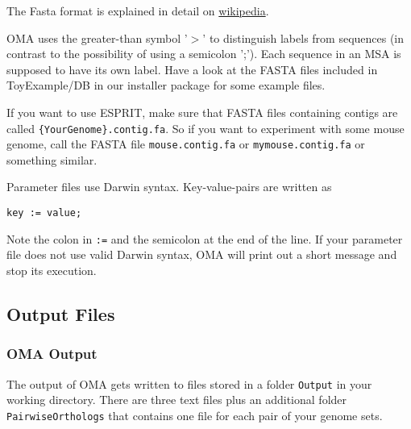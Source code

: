 \documentclass{scrartcl}
\begin{document}
\noindent The Fasta format is explained in detail on \href{http://en.wikipedia.org/wiki/FASTA\_format}{wikipedia}.

\noindent OMA uses the greater-than symbol '$>$' to 
            distinguish labels from sequences (in contrast to the possibility
            of using a semicolon ';'). Each sequence in an MSA is supposed
            to have its own label. Have a look at the FASTA files included in 
            ToyExample/DB in our installer package for some example files.

\noindent If you want to use ESPRIT, make sure that FASTA files
            containing contigs are called \texttt{\{YourGenome\}.contig.fa}.
            So if you want to experiment with some mouse genome, call the 
            FASTA file \texttt{mouse.contig.fa} or \texttt{mymouse.contig.fa} or something similar.

\noindent Parameter files use Darwin syntax.  Key-value-pairs 
            are written as

\noindent \begin{verbatim}
key := value;
\end{verbatim}


\noindent Note the colon in \texttt{:=} and the semicolon at 
            the end of the line. If your parameter file does not use valid 
            Darwin syntax, OMA will print out a short message and stop its 
            execution.
\subsection{Output Files}\subsubsection{OMA Output}
\noindent The output of OMA gets written to files stored in 
            a folder \texttt{Output} in your working directory. There are 
            three text files plus an additional folder \texttt{PairwiseOrthologs} that contains one file for each pair of
            your genome sets.
\end{document}

